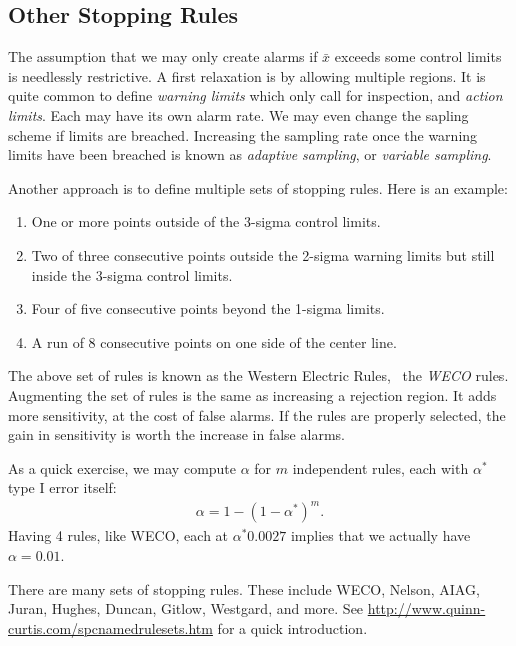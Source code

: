 \subsection{Other Stopping Rules}
\label{sec:stopping_rules}

The assumption that we may only create alarms if $\bar{x}$ exceeds some control limits is needlessly restrictive.
A first relaxation is by allowing multiple regions.
It is quite common to define \emph{warning limits} which only call for inspection, and \emph{action limits}. Each may have its own alarm rate.
We may even change the sapling scheme if limits are breached. Increasing the sampling rate once the warning limits have been breached is known as \emph{adaptive sampling}, or \emph{variable sampling}.



Another approach is to define multiple sets of stopping rules.
Here is an example:
\begin{enumerate}
\item One or more points outside of the 3-sigma control limits.
\item Two of three consecutive points outside the 2-sigma warning limits but still inside the 3-sigma control limits.
\item Four of five consecutive points beyond the 1-sigma limits.
\item A run of 8 consecutive points on one side of the center line.
\end{enumerate}
The above set of rules is known as the Western Electric Rules, \aka\, the \emph{WECO} rules.
Augmenting the set of rules is the same as increasing a rejection region. It adds more sensitivity, at the cost of false alarms. If the rules are properly selected, the gain in sensitivity is worth the increase in false alarms.

As a quick exercise, we may compute $\alpha$  for $m$ independent rules, each with $\alpha^*$ type I error itself:
\begin{align}
	\alpha=1-(1-\alpha^*)^m.
\end{align}
Having 4 rules, like WECO, each at $\alpha^*0.0027$ implies that we actually have $\alpha=0.01$.

\begin{extra}
There are many sets of stopping rules. 
These include WECO, Nelson, AIAG, Juran, Hughes, Duncan, Gitlow, Westgard, and more. 
See \url{http://www.quinn-curtis.com/spcnamedrulesets.htm} for a quick introduction.
\end{extra}



